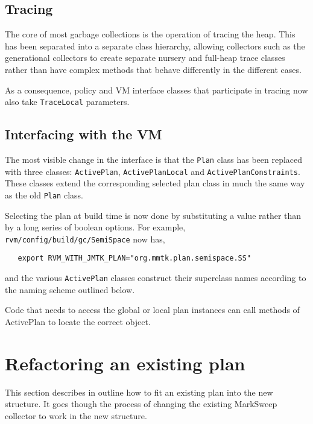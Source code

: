 \documentclass[10pt]{article}
\newcommand{\code}[1]{\lstinline!#1!}
\begin{document}
\subsection{Tracing}

The core of most garbage collections is the operation of tracing the
heap.  This has been separated into a separate class hierarchy,
allowing collectors such as the generational collectors to create
separate nursery and full-heap trace classes rather than have complex
methods that behave differently in the different cases.

As a consequence, policy and VM interface classes that participate in
tracing now also take \code{TraceLocal} parameters.

\subsection{Interfacing with the VM}

The most visible change in the interface is that the \code{Plan} class
has been replaced with three classes: \code{ActivePlan},
\code{ActivePlanLocal} and \code{ActivePlanConstraints}.  These classes
extend the corresponding selected plan class in much the same
way as the old \code{Plan} class.

Selecting the plan at build time is now done by substituting a value
rather than by a long series of boolean options.  For example,
\code{rvm/config/build/gc/SemiSpace} now has,
\begin{lstlisting}
   export RVM_WITH_JMTK_PLAN="org.mmtk.plan.semispace.SS"
\end{lstlisting} 
and the various \code{ActivePlan} classes construct their superclass
names according to the naming scheme outlined below.

Code that needs to access the global or local plan instances can call
methods of ActivePlan to locate the correct object.

\section{Refactoring an existing plan}

This section describes in outline how to fit an existing plan into the
new structure.  It goes though the process of changing the existing
MarkSweep collector to work in the new structure.
\end{document}
